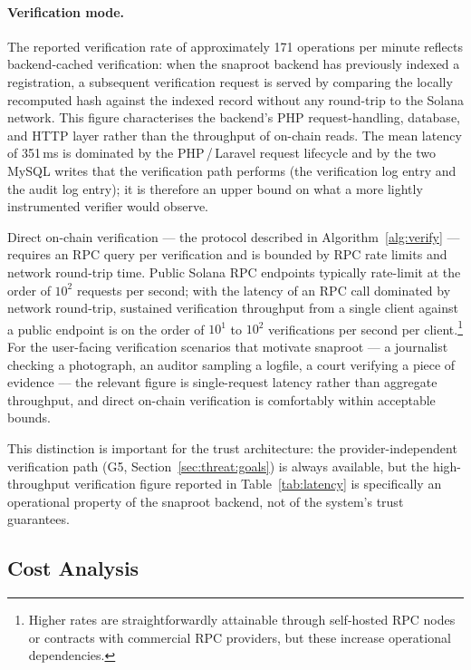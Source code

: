 \documentclass[11pt,a4paper]{article}
\begin{document}
\paragraph{Verification mode.} The reported verification rate of
approximately 171 operations per minute reflects backend-cached
verification: when the snaproot backend has previously indexed a
registration, a subsequent verification request is served by comparing
the locally recomputed hash against the indexed record without any
round-trip to the Solana network. This figure characterises the
backend's PHP request-handling, database, and HTTP layer rather than
the throughput of on-chain reads. The mean latency of 351\,ms is
dominated by the PHP\,/\,Laravel request lifecycle and by the two
MySQL writes that the verification path performs (the verification log
entry and the audit log entry); it is therefore an upper bound on what
a more lightly instrumented verifier would observe.

Direct on-chain verification --- the protocol described in
Algorithm~\ref{alg:verify} --- requires an RPC query per verification
and is bounded by RPC rate limits and network round-trip time. Public
Solana RPC endpoints typically rate-limit at the order of $10^2$
requests per second; with the latency of an RPC call dominated by
network round-trip, sustained verification throughput from a single
client against a public endpoint is on the order of $10^1$ to $10^2$
verifications per second per client.\footnote{Higher rates are
straightforwardly attainable through self-hosted RPC nodes or contracts
with commercial RPC providers, but these increase operational
dependencies.} For the user-facing verification scenarios that motivate
snaproot --- a journalist checking a photograph, an auditor sampling a
logfile, a court verifying a piece of evidence --- the relevant figure
is single-request latency rather than aggregate throughput, and direct
on-chain verification is comfortably within acceptable bounds.

This distinction is important for the trust architecture: the
provider-independent verification path (G5,
Section~\ref{sec:threat:goals}) is always available, but the
high-throughput verification figure reported in
Table~\ref{tab:latency} is specifically an operational property of the
snaproot backend, not of the system's trust guarantees.

\subsection{Cost Analysis}
\label{sec:evaluation:cost}
\end{document}
